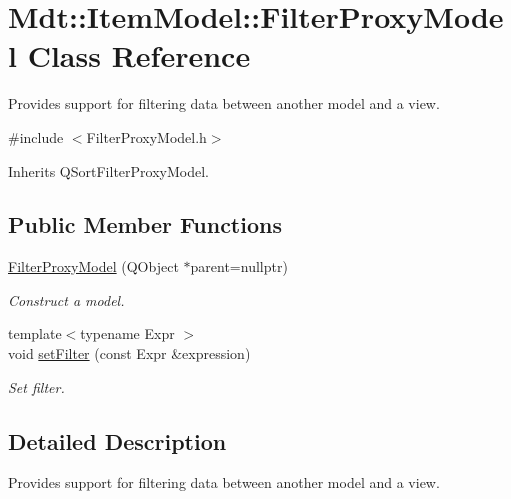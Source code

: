 \hypertarget{class_mdt_1_1_item_model_1_1_filter_proxy_model}{}\section{Mdt\+:\+:Item\+Model\+:\+:Filter\+Proxy\+Model Class Reference}
\label{class_mdt_1_1_item_model_1_1_filter_proxy_model}


Provides support for filtering data between another model and a view.  




{\ttfamily \#include $<$Filter\+Proxy\+Model.\+h$>$}



Inherits Q\+Sort\+Filter\+Proxy\+Model.

\subsection*{Public Member Functions}
\begin{DoxyCompactItemize}
\item 
\hyperlink{class_mdt_1_1_item_model_1_1_filter_proxy_model_ae4b63b2126cab9f54e260117fb265f7f}{Filter\+Proxy\+Model} (Q\+Object $\ast$parent=nullptr)\hypertarget{class_mdt_1_1_item_model_1_1_filter_proxy_model_ae4b63b2126cab9f54e260117fb265f7f}{}\label{class_mdt_1_1_item_model_1_1_filter_proxy_model_ae4b63b2126cab9f54e260117fb265f7f}

\begin{DoxyCompactList}\small\item\em Construct a model. \end{DoxyCompactList}\item 
{\footnotesize template$<$typename Expr $>$ }\\void \hyperlink{class_mdt_1_1_item_model_1_1_filter_proxy_model_aaa024269494ef8cce449b87f759d431a}{set\+Filter} (const Expr \&expression)
\begin{DoxyCompactList}\small\item\em Set filter. \end{DoxyCompactList}\end{DoxyCompactItemize}


\subsection{Detailed Description}
Provides support for filtering data between another model and a view. 

